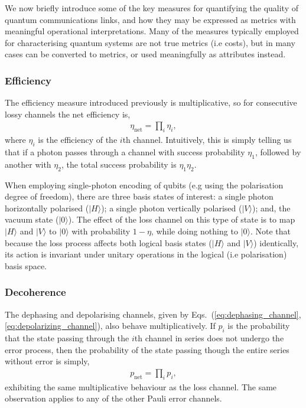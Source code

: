 \documentclass[aps,rmp,twocolumn,amsmath,amssymb,nofootinbib,superscriptaddress,longbibliography,floatfix,table-of-contents,eqsecnum]{revtex4-1}
\newcommand{\ket}[1]{|#1\rangle}
\begin{document}
We now briefly introduce some of the key measures for quantifying the quality of quantum communications links, and how they may be expressed as metrics with meaningful operational interpretations. Many of the measures typically employed for characterising quantum systems are not true metrics (i.e costs), but in many cases can be converted to metrics, or used meaningfully as attributes instead.

%
%

\subsubsection{Efficiency} 

The efficiency measure introduced previously is multiplicative, so for consecutive lossy channels the net efficiency is,
\begin{align}
\eta_\text{net}=\prod_i \eta_i,
\end{align}
where $\eta_i$ is the efficiency of the $i$th channel. Intuitively, this is simply telling us that if a photon passes through a channel with success probability $\eta_1$, followed by another with $\eta_2$, the total success probability is \mbox{$\eta_1\eta_2$}.

When employing single-photon encoding of qubits (e.g using the polarisation degree of freedom), there are three basis states of interest: a single photon horizontally polarised ($\ket{H}$); a single photon vertically polarised ($\ket{V}$); and, the vacuum state ($\ket{0}$). The effect of the loss channel on this type of state is to map $\ket{H}$ and $\ket{V}$ to $\ket{\text{0}}$ with probability \mbox{$1-\eta$}, while doing nothing to $\ket{\text{0}}$. Note that because the loss process affects both logical basis states ($\ket{H}$ and $\ket{V}$) identically, its action is invariant under unitary operations in the logical (i.e polarisation) basis space.

%
%

\subsubsection{Decoherence}   

The dephasing and depolarising channels, given by Eqs.~(\ref{eq:dephasing_channel},\ref{eq:depolarizing_channel}), also behave multiplicatively. If $p_i$ is the probability that the state passing through the $i$th channel in series does not undergo the error process, then the probability of the state passing though the entire series without error is simply,
\begin{align}
p_\text{net}=\prod_i p_i,
\end{align}
exhibiting the same multiplicative behaviour as the loss channel. The same observation applies to any of the other Pauli error channels.
\end{document}
